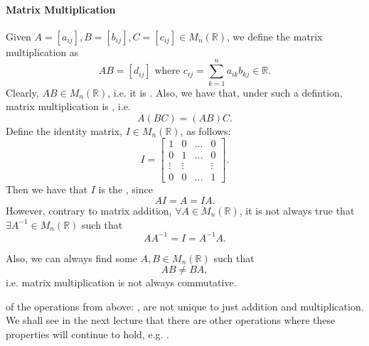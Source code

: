 \paragraph{Matrix Multiplication} Given $A = [a_{ij}], B = [b_{ij}], C = [c_{ij}] \in M_n(\mathbb{R})$, we define the matrix multiplication as
\begin{equation*}
  AB = [d_{ij}] \text{ where } c_{ij} = \sum_{k=1}^{n} a_{ik} b_{kj} \in \mathbb{R}.
\end{equation*}
Clearly, $AB \in M_n(\mathbb{R})$, i.e. it is . Also, we have that, under such a defintion, matrix multiplication is , i.e.
\begin{equation*}
  A(BC) = (AB)C.
\end{equation*}
Define the identity matrix, $I \in M_n(\mathbb{R})$, as follows:
\begin{equation*}
  I = \begin{bmatrix}
    1      &   0    & \hdots & 0 \\
    0      &   1    & \hdots & 0 \\
    \vdots & \vdots &        & \vdots \\
    0      &   0    & \hdots & 1
  \end{bmatrix}.
\end{equation*}
Then we have that $I$ is the , since
\begin{equation*}
  AI = A = IA.
\end{equation*}
However, contrary to matrix addition, $\forall A \in M_n(\mathbb{R})$, it is not always true that $\exists A^{-1} \in M_n(\mathbb{R})$ such that
\begin{equation*}
  AA^{-1} = I = A^{-1} A.
\end{equation*}

Also, we can always find some $A, B \in M_n(\mathbb{R})$ such that
\begin{equation*}
  AB \neq BA,
\end{equation*}
i.e. matrix multiplication is not always commutative.

 of the operations from above: , are not unique to just addition and multiplication. We shall see in the next lecture that there are other operations where these properties will continue to hold, e.g. .



